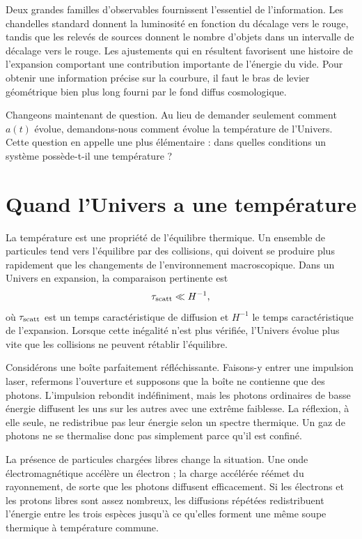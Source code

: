 Deux grandes familles d’observables fournissent l’essentiel de l’information. Les chandelles standard donnent la luminosité en fonction du décalage vers le rouge, tandis que les relevés de sources donnent le nombre d’objets dans un intervalle de décalage vers le rouge. Les ajustements qui en résultent favorisent une histoire de l’expansion comportant une contribution importante de l’énergie du vide. Pour obtenir une information précise sur la courbure, il faut le bras de levier géométrique bien plus long fourni par le fond diffus cosmologique.

Changeons maintenant de question. Au lieu de demander seulement comment \(a(t)\) évolue, demandons-nous comment évolue la température de l’Univers. Cette question en appelle une plus élémentaire : dans quelles conditions un système possède-t-il une température ?

\section{Quand l’Univers a une température}

La température est une propriété de l’équilibre thermique. Un ensemble de particules tend vers l’équilibre par des collisions, qui doivent se produire plus rapidement que les changements de l’environnement macroscopique. Dans un Univers en expansion, la comparaison pertinente est
\begin{equation}
\tau_{\rm scatt}\ll H^{-1},
\label{eq:c07-equilibrium-condition}
\end{equation}
où \(\tau_{\rm scatt}\) est un temps caractéristique de diffusion et \(H^{-1}\) le temps caractéristique de l’expansion. Lorsque cette inégalité n’est plus vérifiée, l’Univers évolue plus vite que les collisions ne peuvent rétablir l’équilibre.

Considérons une boîte parfaitement réfléchissante. Faisons-y entrer une impulsion laser, refermons l’ouverture et supposons que la boîte ne contienne que des photons. L’impulsion rebondit indéfiniment, mais les photons ordinaires de basse énergie diffusent les uns sur les autres avec une extrême faiblesse. La réflexion, à elle seule, ne redistribue pas leur énergie selon un spectre thermique. Un gaz de photons ne se thermalise donc pas simplement parce qu’il est confiné.

La présence de particules chargées libres change la situation. Une onde électromagnétique accélère un électron ; la charge accélérée réémet du rayonnement, de sorte que les photons diffusent efficacement. Si les électrons et les protons libres sont assez nombreux, les diffusions répétées redistribuent l’énergie entre les trois espèces jusqu’à ce qu’elles forment une même soupe thermique à température commune.

